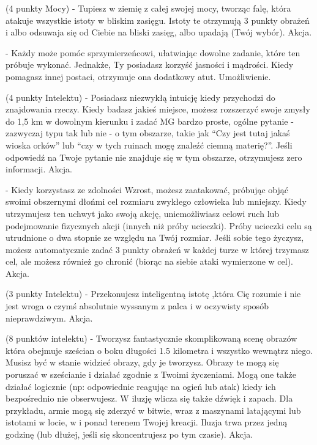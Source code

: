{ (4 punkty Mocy) - Tupiesz w ziemię z całej swojej mocy, tworząc falę, która atakuje wszystkie istoty w bliskim zasięgu. Istoty te otrzymują 3 punkty obrażeń i albo odsuwaja się od Ciebie na bliski zasięg, albo upadają (Twój wybór). Akcja.

 - Każdy może pomóc sprzymierzeńcowi, ułatwiając dowolne zadanie, które ten próbuje wykonać. Jednakże, Ty posiadasz korzyść jasności i mądrości. Kiedy pomagasz innej postaci, otrzymuje ona dodatkowy atut. Umożliwienie.

 (4 punkty Intelektu) - Posiadasz niezwykłą intuicję kiedy przychodzi do znajdowania rzeczy. Kiedy badasz jakieś miejsce, możesz rozszerzyć swoje zmysły do 1,5 km w dowolnym kierunku i zadać MG bardzo proste, ogólne pytanie - zazwyczaj typu tak lub nie - o tym obszarze, takie jak ``Czy jest tutaj jakaś wioska orków'' lub ``czy w tych ruinach mogę znaleźć ciemną materię?''. Jeśli odpowiedź na Twoje pytanie nie znajduje się w tym obszarze, otrzymujesz zero informacji. Akcja.

 - Kiedy korzystasz ze zdolności Wzrost, możesz zaatakować, próbując objąć swoimi obszernymi dłońmi cel rozmiaru zwykłego człowieka lub mniejszy. Kiedy utrzymujesz ten uchwyt jako swoją akcję, uniemożliwiasz celowi ruch lub podejmowanie fizycznych akcji (innych niż próby ucieczki). Próby ucieczki celu są utrudnione o dwa stopnie ze względu na Twój rozmiar. Jeśli sobie tego życzysz, możesz automatycznie zadać 3 punkty obrażeń w każdej turze w której trzymasz cel, ale możesz również go chronić (biorąc na siebie ataki wymierzone w cel). Akcja.

 (3 punkty Intelektu) - Przekonujesz inteligentną istotę ,która Cię rozumie i nie jest wroga o czymś absolutnie wyssanym z palca i w oczywisty sposób nieprawdziwym. Akcja. 

 (8 punktów intelektu) - Tworzysz fantastycznie skomplikowaną scenę obrazów która obejmuje sześcian o boku długości 1.5 kilometra i wszystko wewnątrz niego. Musisz być w stanie widzieć obrazy, gdy je tworzysz. Obrazy te mogą się poruszać w sześcianie i działać zgodnie z Twoimi życzeniami. Mogą one także działać logicznie (np: odpowiednie reagując na ogień lub atak) kiedy ich bezpośrednio nie obserwujesz. W iluzję wlicza się także dźwięk i zapach. Dla przykładu, armie mogą się zderzyć w bitwie, wraz z maszynami latającymi lub istotami w locie, w i ponad terenem Twojej kreacji. Iluzja trwa przez jedną godzinę (lub dłużej, jeśli się skoncentrujesz po tym czasie). Akcja.

}
